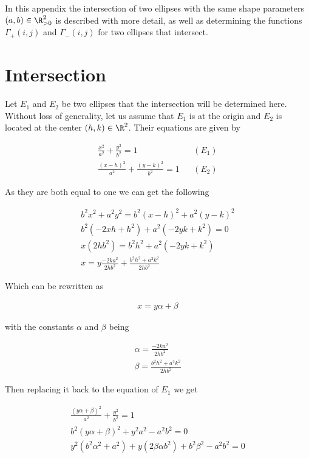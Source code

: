 In this appendix the intersection of two ellipses with the same shape parameters $(a,b) \in \R^2_{>0}$ is described with more detail, as well as determining the functions $\Gamma_+(i,j)$ and $\Gamma_-(i,j)$ for two ellipses that intersect.

\section{Intersection}

Let $E_1$ and $E_2$ be two ellipses that the intersection will be determined here. Without loss of generality, let us assume that $E_1$ is at the origin and $E_2$ is located at the center $(h,k) \in \R^2$. Their equations are given by

\begin{align*}
    \frac{x^2}{a^2} + \frac{y^2}{b^2} = 1 && (E_1)\\
    \frac{(x-h)^2}{a^2} + \frac{(y-k)^2}{b^2} = 1 && (E_2)
\end{align*}

As they are both equal to one we can get the following

\begin{align*}
    b^2x^2 + a^2y^2 = b^2(x-h)^2 + a^2(y-k)^2 \\
    b^2(-2xh + h^2) + a^2(-2yk + k^2) = 0\\
    x(2hb^2) = b^2h^2 + a^2(-2yk + k^2)\\
    x = y\frac{-2ka^2}{2hb^2} + \frac{b^2h^2 + a^2k^2}{2hb^2}
\end{align*}

Which can be rewritten as

\begin{align*}
    x = y\alpha + \beta
\end{align*}

with the constants $\alpha$ and $\beta$ being

\begin{align*}
    \alpha = \frac{-2ka^2}{2hb^2} \\
    \beta = \frac{b^2h^2 + a^2k^2}{2hb^2}
\end{align*}

Then replacing it back to the equation of $E_1$ we get

\begin{align*}
    \frac{(y\alpha + \beta)^2}{a^2} + \frac{y^2}{b^2} = 1\\
    b^2(y\alpha + \beta)^2 + y^2a^2 - a^2b^2 = 0\\
    y^2(b^2\alpha^2 + a^2) + y(2\beta\alpha b^2) + b^2\beta^2 -a^2b^2 = 0
\end{align*}

